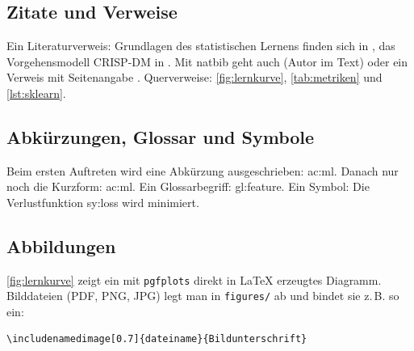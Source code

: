 \chapter{}\label{chap:beispiele}

\section{Zitate und Verweise}
Ein Literaturverweis: Grundlagen des statistischen Lernens finden sich in
\cite{hastie2009}, das Vorgehensmodell CRISP-DM in \cite{chapman2000}.
Mit natbib geht auch \citet{pedregosa2011} (Autor im Text) oder ein Verweis
mit Seitenangabe \cite[S.~42]{hastie2009}.
Querverweise: \autoref{fig:lernkurve}, \autoref{tab:metriken} und
\autoref{lst:sklearn}.

\section{Abkürzungen, Glossar und Symbole}
Beim ersten Auftreten wird eine Abkürzung ausgeschrieben: \gls{ac:ml}.
Danach nur noch die Kurzform: \gls{ac:ml}. Ein Glossarbegriff: \gls{gl:feature}.
Ein Symbol: Die Verlustfunktion \gls{sy:loss} wird minimiert.

\section{Abbildungen}
\autoref{fig:lernkurve} zeigt ein mit \texttt{pgfplots} direkt in \LaTeX{}
erzeugtes Diagramm. Bilddateien (PDF, PNG, JPG) legt man in \texttt{figures/}
ab und bindet sie z.\,B. so ein:
\begin{lstlisting}[language={[LaTeX]TeX}, numbers=none]
\includenamedimage[0.7]{dateiname}{Bildunterschrift}
\end{lstlisting}

\begin{figure}[htbp]
  \centering
  \caption{}
  \label{fig:lernkurve}
\end{figure}

